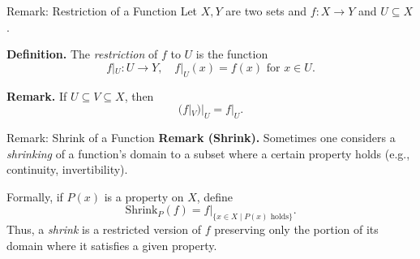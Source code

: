 \documentclass[11pt,aspectratio=43,ignorenonframetext,t]{beamer}
\begin{document}
\begin{frame}{Remark: Restriction of a Function}
Let $X, Y$ are two sets and \(f:X\to Y\) and \(U\subseteq X\).

\textbf{Definition.}
The \emph{restriction} of \(f\) to \(U\) is the function
\[
f|_U : U \to Y, \quad f|_U(x) = f(x)\text{ for }x\in U.
\]

\textbf{Remark.}
If \(U\subseteq V\subseteq X\), then
\[
(f|_V)|_U = f|_U.
\]

\centering
{}


\end{frame}

\begin{frame}{Remark: Shrink of a Function}
\textbf{Remark (Shrink).}  
Sometimes one considers a \emph{shrinking} of a function’s domain to a subset where a certain property holds (e.g., continuity, invertibility).

Formally, if \(P(x)\) is a property on \(X\), define
\[
\text{Shrink}_P(f) = f|_{\{x\in X \mid P(x)\text{ holds}\}}.
\]
Thus, a \emph{shrink} is a restricted version of \(f\) preserving only the portion of its domain where it satisfies a given property.
\end{frame}
\end{document}
